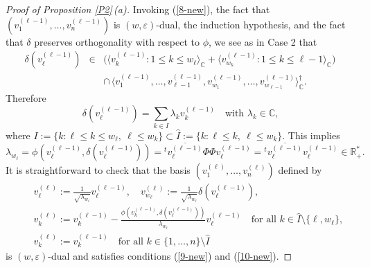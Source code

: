 \documentclass{amsart}
\theoremstyle{definition}
\begin{document}
\begin{proof}[Proof of Proposition \ref{P2}\,{\rm (a)}]
\medskip
{}

Invoking (\ref{8-new}), the fact that
$(v_1^{(\ell-1)},\ldots,v_n^{(\ell-1)})$ is
$(w,\varepsilon)$-dual, the induction hypothesis, and the fact
that $\delta$ preserves orthogonality with respect to $\phi$, we see as in Case 2 that
\begin{eqnarray*}
\delta(v_\ell^{(\ell-1)}) & \in & \big(\langle v_k^{(\ell-1)}:1\leq
k\leq w_\ell\rangle_\mathbb{C}+\langle v_{w_k}^{(\ell-1)}:1\leq k\leq
\ell-1\rangle_\mathbb{C}\big) \\
 & & \cap\,\langle
v_1^{(\ell-1)},\ldots,v_{\ell-1}^{(\ell-1)},v_{w_1}^{(\ell-1)},\ldots,v_{w_{\ell-1}}^{(\ell-1)}\rangle_\mathbb{C}^\dag.
\end{eqnarray*} Therefore
\begin{equation} \label{11-new}
\delta(v_\ell^{(\ell-1)})=\sum_{k\in
I}\lambda_kv_k^{(\ell-1)}\quad\mbox{with $\lambda_k\in\mathbb{C}$,}
\end{equation}
where $I:=\{k:\ell\leq k\leq w_\ell,\ \ell\leq w_k\}\subset\hat{I}:=\{k:\ell\leq k,\ \ell\leq w_k\}$.
This implies
\[\lambda_{w_\ell}=\phi(v_\ell^{(\ell-1)},\delta(v_\ell^{(\ell-1)}))={}^t\overline{v_\ell^{(\ell-1)}}\Phi\Phi v_\ell^{(\ell-1)}={}^t\overline{v_\ell^{(\ell-1)}}v_\ell^{(\ell-1)}\in\mathbb{R}_+^*.\]
It is straightforward to check that the basis
$(v_1^{(\ell)},\ldots,v_n^{(\ell)})$ defined by
\begin{eqnarray*}
 & & v_\ell^{(\ell)}:=\frac{1}{\sqrt{\lambda_{w_\ell}}}v_\ell^{(\ell-1)},\quad
v_{w_\ell}^{(\ell)}:=\frac{1}{\sqrt{\lambda_{w_\ell}}}\delta(v_\ell^{(\ell-1)}),
\\
 & & v_k^{(\ell)}:=v_k^{(\ell-1)}-\frac{\phi(v_k^{(\ell-1)},\delta(v_\ell^{(\ell-1)}))}{\lambda_{w_\ell}}v_\ell^{(\ell-1)}
\quad\mbox{for all $k\in \hat{I}\setminus\{\ell,w_\ell\}$,} \\
 &  & v_k^{(\ell)}:=v_k^{(\ell-1)}\quad\mbox{for all $k\in\{1,\ldots,n\}\setminus \hat{I}$}
\end{eqnarray*}
is $(w,\varepsilon)$-dual and satisfies conditions
(\ref{9-new}) and (\ref{10-new}).
\end{proof}
\end{document}
